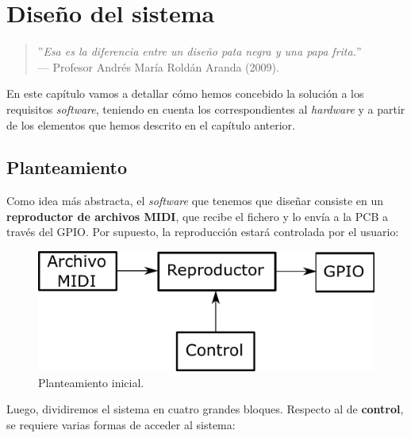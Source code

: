 \chapter{Diseño del sistema}
\label{cap: capitulo_4}

\begin{quote}
	\small \flushright ''\textit{Esa es la diferencia entre un diseño pata negra y una papa frita.}'' \\
	--- Profesor Andrés María Roldán Aranda (2009).
\end{quote}

\vspace{8em}

En este capítulo vamos a detallar cómo hemos concebido la solución a los requisitos \textit{software}, teniendo en cuenta los correspondientes al \textit{hardware} y a partir de los elementos que hemos descrito en el capítulo anterior.

\newpage

\section{Planteamiento}

Como idea más abstracta, el \textit{software} que tenemos que diseñar consiste en un \textbf{reproductor de archivos \acrshort{MIDI}}, que recibe el fichero y lo envía a la \acrshort{PCB} a través del \acrshort{GPIO}. Por supuesto, la reproducción estará controlada por el usuario:

\smallskip

\begin{figure}[H]
	\noindent \begin{centering}
		\includegraphics[width=\linewidth/2]{capitulo4/idea}
		\par\end{centering}
	\smallskip
	\caption{\label{fig:idea} Planteamiento inicial.}
\end{figure} 

\smallskip

Luego, dividiremos el sistema en cuatro grandes bloques. Respecto al de \textbf{control}, se requiere varias formas de acceder al sistema:


